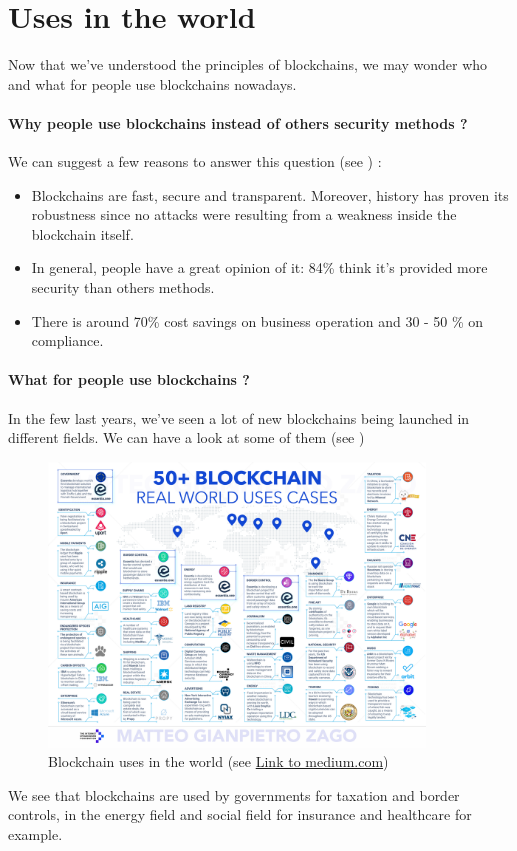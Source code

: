 \section{Uses in the world}

Now that we've understood the principles of blockchains, we may wonder who and what for people use blockchains nowadays.

\paragraph{Why people use blockchains instead of others security methods ?}

We can suggest a few reasons to answer this question (see \cite{blockchainPros}) :

\begin{itemize}
  \item Blockchains are fast, secure and transparent. Moreover, history has proven its robustness since no attacks were resulting from a weakness inside the blockchain itself.
  \item In general, people have a great opinion of it: 84\% think it's provided more security than others methods.
  \item There is around 70\% cost savings on business operation and 30 - 50 \% on compliance.
\end{itemize}

\paragraph{What for people use blockchains ?}

In the few last years, we've seen a lot of new blockchains being launched in different fields. We can have a look at some of them (see \cite{usesBlockchain})\newline

\begin{figure}[ht]
\centering
\includegraphics[width=10cm]{Figures/blockchainUses}
\caption{Blockchain uses in the world (see \href{https://medium.com/@matteozago/50-examples-of-how-blockchains-are-taking-over-the-world-4276bf488a4b}{Link to medium.com})}
\end{figure}
\medskip

We see that blockchains are used by governments for taxation and border controls, in the energy field and social field for insurance and healthcare for example.
